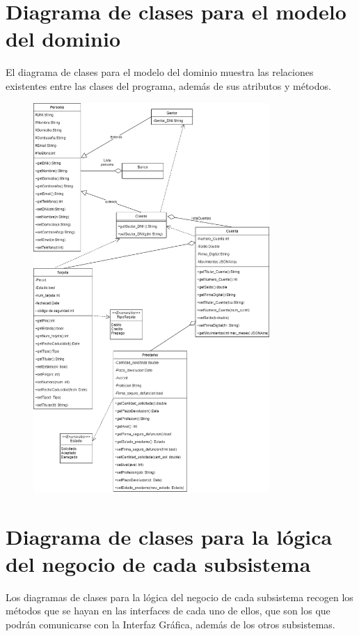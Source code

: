 \documentclass[12pt]{article}
\begin{document}
\section{Diagrama de clases para el modelo del dominio}
El diagrama de clases para el modelo del dominio muestra las relaciones existentes entre las clases del programa, además de sus atributos y métodos.
\begin{figure}[H]
    \centering
    \includegraphics[width=0.8\textwidth]{images/Diagrama_de_clases.png}
\end{figure}

\newpage
\section{Diagrama de clases para la lógica del negocio de cada subsistema}
Los diagramas de clases para la lógica del negocio de cada subsistema recogen los métodos que se hayan en las interfaces de cada uno de ellos, que son los que podrán comunicarse con la Interfaz Gráfica, además de los otros subsistemas.
\end{document}
